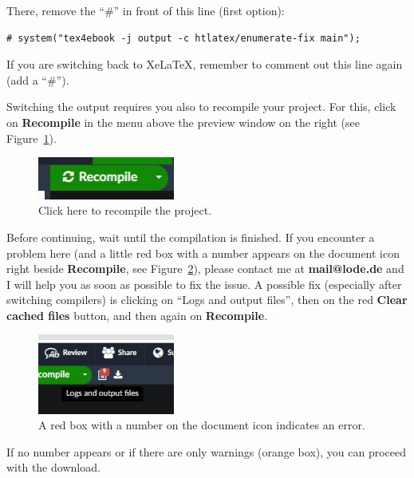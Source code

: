 There, remove the ``\#'' in front of this line (first option):

\begin{lstlisting}
# system("tex4ebook -j output -c htlatex/enumerate-fix main");
\end{lstlisting}

If you are switching back to XeLaTeX, remember to comment out this line again (add a ``\#'').

Switching the output requires you also to recompile your project. For this, click on \textbf{Recompile} in the menu above the preview window on the right (see Figure~\ref{recompile:fig}).


\begin{figure}[H]\centering
\includegraphics[width=0.4\textwidth]{images/recompile.jpg}
\caption{Click here to recompile the project.}
\label{recompile:fig}
\end{figure}

Before continuing, wait until the compilation is finished. If you encounter a problem here (and a little red box with a number appears on the document icon right beside \textbf{Recompile}, see Figure~\ref{error:fig}), please contact me at \textbf{mail@lode.de} and I will help you as soon as possible to fix the issue. A possible fix (especially after switching compilers) is clicking on ``Logs and output files'', then on the red \textbf{Clear cached files} button, and then again on \textbf{Recompile}.

\begin{figure}[H]\centering
\includegraphics[width=0.4\textwidth]{images/error.jpg}
\caption{A red box with a number on the document icon indicates an error.}
\label{error:fig}
\end{figure}

If no number appears or if there are only warnings (orange box), you can proceed with the download.

